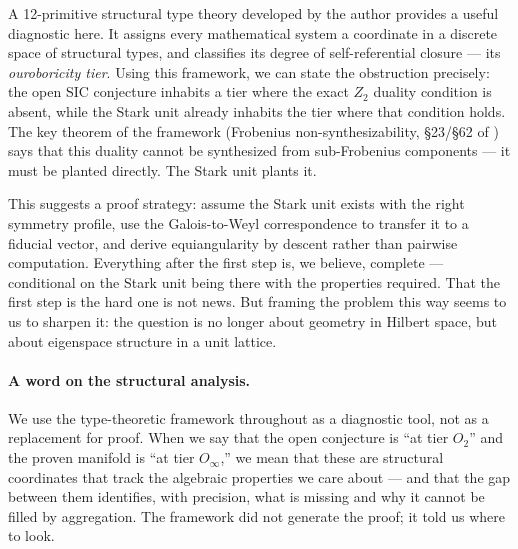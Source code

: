 \documentclass[12pt]{article}
\theoremstyle{plain}
\theoremstyle{definition}
\theoremstyle{remark}
\begin{document}
A 12-primitive structural type theory developed by the author \cite{synthref} provides a useful diagnostic here. It assigns every mathematical system a coordinate in a discrete space of structural types, and classifies its degree of self-referential closure — its \emph{ouroboricity tier}. Using this framework, we can state the obstruction precisely: the open SIC conjecture inhabits a tier where the exact $Z_2$ duality condition is absent, while the Stark unit already inhabits the tier where that condition holds. The key theorem of the framework (Frobenius non-synthesizability, §23/§62 of \cite{synthref}) says that this duality cannot be synthesized from sub-Frobenius components — it must be planted directly. The Stark unit plants it.

This suggests a proof strategy: assume the Stark unit exists with the right symmetry profile, use the Galois-to-Weyl correspondence to transfer it to a fiducial vector, and derive equiangularity by descent rather than pairwise computation. Everything after the first step is, we believe, complete — conditional on the Stark unit being there with the properties required. That the first step is the hard one is not news. But framing the problem this way seems to us to sharpen it: the question is no longer about geometry in Hilbert space, but about eigenspace structure in a unit lattice.

\paragraph{A word on the structural analysis.} We use the type-theoretic framework \cite{synthref} throughout as a diagnostic tool, not as a replacement for proof. When we say that the open conjecture is ``at tier $O_2$'' and the proven manifold is ``at tier $O_\infty$,'' we mean that these are structural coordinates that track the algebraic properties we care about — and that the gap between them identifies, with precision, what is missing and why it cannot be filled by aggregation. The framework did not generate the proof; it told us where to look.
\end{document}
